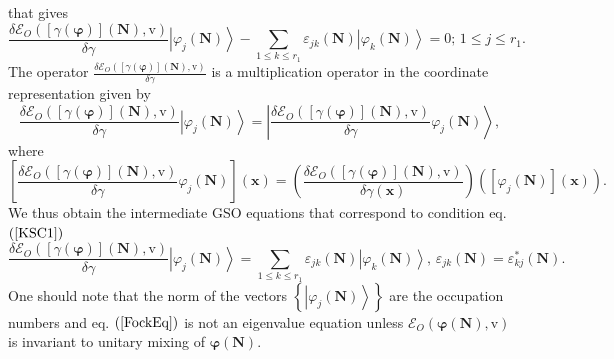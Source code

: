 \documentclass[aps,preprint]{revtex4}%
\begin{document}
that gives%
\begin{equation}
\frac{\delta\mathcal{E}_{O}\left(  \left[  \gamma\left(  \mathbf{\varphi
}\right)  \right]  \mathbf{\left(  \mathbf{N}\right)  ,}\mathrm{v}\right)
}{\delta\gamma}\left\vert \varphi_{j}\left(  \mathbf{N}\right)  \right\rangle
-\sum_{1\leq k\leq r_{1}}\varepsilon_{jk}\left(  \mathbf{N}\right)  \left\vert
\varphi_{k}\left(  \mathbf{N}\right)  \right\rangle =0;\,1\leq j\leq r_{1}.
\end{equation}
The operator $\frac{\delta\mathcal{E}_{O}\left(  \left[  \gamma\left(
\mathbf{\varphi}\right)  \right]  \mathbf{\left(  \mathbf{N}\right)
,}\mathrm{v}\right)  }{\delta\gamma}$ is a multiplication operator in the
coordinate representation given by
\begin{equation}
\frac{\delta\mathcal{E}_{O}\left(  \left[  \gamma\left(  \mathbf{\varphi
}\right)  \right]  \mathbf{\left(  \mathbf{N}\right)  ,}\mathrm{v}\right)
}{\delta\gamma}\left\vert \varphi_{j}\left(  \mathbf{N}\right)  \right\rangle
=\left\vert \frac{\delta\mathcal{E}_{O}\left(  \left[  \gamma\left(
\mathbf{\varphi}\right)  \right]  \mathbf{\left(  \mathbf{N}\right)
,}\mathrm{v}\right)  }{\delta\gamma}\varphi_{j}\left(  \mathbf{N}\right)
\right\rangle ,
\end{equation}
where
\begin{equation}
\left[  \frac{\delta\mathcal{E}_{O}\left(  \left[  \gamma\left(
\mathbf{\varphi}\right)  \right]  \mathbf{\left(  \mathbf{N}\right)
,}\mathrm{v}\right)  }{\delta\gamma}\varphi_{j}\left(  \mathbf{N}\right)
\right]  \left(  \mathbf{x}\right)  =\left(  \frac{\delta\mathcal{E}%
_{O}\left(  \left[  \gamma\left(  \mathbf{\varphi}\right)  \right]
\mathbf{\left(  \mathbf{N}\right)  ,}\mathrm{v}\right)  }{\delta\gamma\left(
\mathbf{x}\right)  }\right)  \left(  \left[  \varphi_{j}\left(  \mathbf{N}%
\right)  \right]  \left(  \mathbf{x}\right)  \right)  .
\end{equation}
We thus obtain the intermediate GSO equations that correspond to condition eq.
$\left(  \ref{KSC1}\right)  $
\begin{equation}
\frac{\delta\mathcal{E}_{O}\left(  \left[  \gamma\left(  \mathbf{\varphi
}\right)  \right]  \mathbf{\left(  \mathbf{N}\right)  ,}\mathrm{v}\right)
}{\delta\gamma}\left\vert \varphi_{j}\left(  \mathbf{N}\right)  \right\rangle
=\sum_{1\leq k\leq r_{1}}\varepsilon_{jk}\left(  \mathbf{N}\right)  \left\vert
\varphi_{k}\left(  \mathbf{N}\right)  \right\rangle ,\,\varepsilon_{jk}\left(
\mathbf{N}\right)  =\varepsilon_{kj}^{\ast}\left(  \mathbf{N}\right)  .
\label{FockEq}%
\end{equation}
One should note that the norm of the vectors $\left\{  \left\vert \varphi
_{j}\left(  \mathbf{N}\right)  \right\rangle \right\}  $ are the occupation
numbers and eq. $\left(  \ref{FockEq}\right)  $ is not an eigenvalue equation
unless $\mathcal{E}_{O}\left(  \mathbf{\varphi}\left(  \mathbf{N}\right)
,\mathrm{v}\right)  $ is invariant to unitary mixing of $\mathbf{\varphi
}\left(  \mathbf{N}\right)  $.
\end{document}
